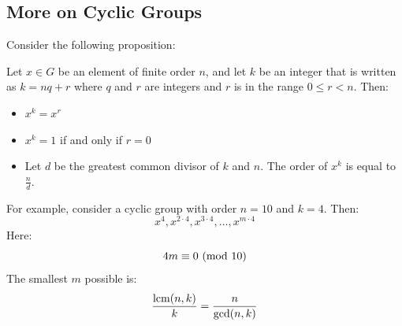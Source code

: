 \documentclass[letterpaper]{article}
\begin{document}
\subsection{More on Cyclic Groups}
Consider the following proposition: 
\begin{mdframed}
    \begin{proposition}
        Let $x \in G$ be an element of finite order $n$, and let $k$ be an integer that is written as $k = nq + r$ where $q$ and $r$ are integers and $r$ is in the range $0 \leq r < n$. Then: 
        \begin{itemize}
            \item $x^k = x^r$ 
            \item $x^k = 1$ if and only if $r = 0$
            \item Let $d$ be the greatest common divisor of $k$ and $n$. The order of $x^k$ is equal to $\frac{n}{d}$. 
        \end{itemize} 
    \end{proposition}
\end{mdframed}

For example, consider a cyclic group with order $n = 10$ and $k = 4$. Then: 
\[x^4, x^{2 \cdot 4}, x^{3 \cdot 4}, \dots, x^{m \cdot 4}\]
Here: 
\[4m \equiv 0 \ (\mathrm{mod}\ 10)\]
The smallest $m$ possible is: 
\[\frac{\operatorname{lcm}(n, k)}{k} = \frac{n}{\gcd(n, k)}\]










\newpage 
\end{document}
